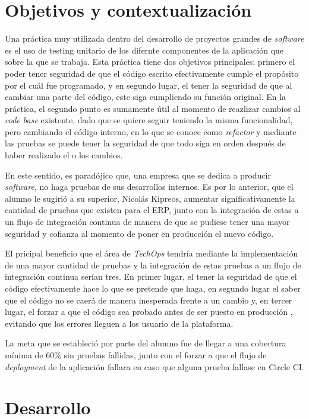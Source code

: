 \textit{}\section{Objetivos y contextualización}

  Una práctica muy utilizada dentro del desarrollo de proyectos grandes de \textit{software} es el uso de testing unitario de los difernte componentes de la aplicación que sobre la que se trabaja. Esta práctica tiene dos objetivos principales: primero el poder tener seguridad de que el código escrito efectivamente cumple el propósito por el cuál fue programado, y en segundo lugar, el tener la seguridad de que al cambiar una parte del código, este siga cumpliendo su función original. En la práctica, el segundo punto es sumamente útil al momento de reazlizar cambios al \textit{code base} existente, dado que se quiere seguir teniendo la misma funcionalidad, pero cambiando el código interno, en lo que se conoce como \textit{refactor} y mediante las pruebas se puede tener la seguridad de que todo siga en orden después de haber realizado el o los cambios. 
  
  En este sentido, es paradójico que, una empresa que se dedica a producir \textit{software}, no haga pruebas de sus desarrollos internos. Es por lo anterior, que el alumno le sugirió a su superior, Nicolás Kipreos, aumentar significativamente la cantidad de pruebas que existen para el ERP, junto con la integración de estas a un flujo de integración continua de manera de que se pudiese tener una mayor seguridad y cofianza al momento de poner en producción el nuevo código.

  El pricipal beneficio que el área de \textit{TechOps} tendría mediante la implementación de una mayor cantidad de pruebas y la integración de estas pruebas a un flujo de integración continua serían tres. En primer lugar, el tener la seguridad de que el código efectivamente hace lo que se pretende que haga, en segundo lugar el saber que el código no se caerá de manera inesperada frente a un cambio y, en tercer lugar, el forzar a que el código sea probado antes de ser puesto en producción \cite{ibm_testing}, evitando que los errores lleguen a los usuario de la plataforma.

  La meta que se estableció por parte del alumno fue de llegar a una cobertura mínima de 60\% sin pruebas fallidas, junto con el forzar a que el flujo de \textit{deployment} de la aplicación fallara en caso que alguna prueba fallase en Circle CI.

\section{Desarrollo}

